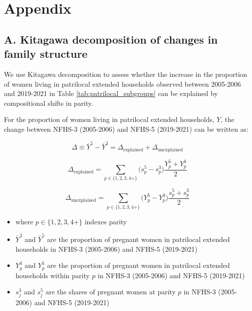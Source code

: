 \documentclass[10pt,twoside,reqno]{article}
\begin{document}
\clearpage
\section*{Appendix}

\setcounter{section}{0}
\renewcommand{\thesection}{A-\arabic{section}}
\setcounter{equation}{0}
\renewcommand{\theequation}{A-\arabic{equation}}
\setcounter{figure}{0}
\renewcommand{\thefigure}{A-\arabic{figure}}
\setcounter{table}{0}
\renewcommand{\thetable}{A-\arabic{table}}




\subsection*{A. Kitagawa decomposition of changes in family structure}

We use Kitagawa decomposition \citep{kitagawa1955components} to assess whether the increase in the proportion of women living in patrilocal extended households observed between 2005-2006 and 2019-2021 in Table \ref{tab:patrilocal_subgroups} can be explained by compositional shifts in parity. 

For the proportion of women living in patrilocal extended households, $Y$, the change between NFHS-3 (2005-2006) and NFHS-5 (2019-2021) can be written as:

\begin{equation}
\Delta \equiv \bar Y^{5} - \bar Y^{3}
= \Delta_{\text{explained}} + \Delta_{\text{unexplained}}
\end{equation}

\begin{equation}
\Delta_{\text{explained}} =
\sum_{p \in \{1,2,3,4+\}} \big(s_p^{5} - s_p^{3}\big)\frac{Y_p^{5} + Y_p^{3}}{2}
\end{equation}

\begin{equation}
\Delta_{\text{unexplained}} =
\sum_{p \in \{1,2,3,4+\}} \big(Y_p^{5} - Y_p^{3}\big)\frac{s_p^{5} + s_p^{3}}{2}
\end{equation}

\begin{itemize}
    \item where $p \in \{1,2,3,4+\}$ indexes parity
    \item $\bar Y^{3}$ and $\bar Y^{5}$ are the proportion of pregnant women in patrilocal extended households in NFHS-3 (2005-2006) and NFHS-5 (2019-2021)
    \item $Y_p^{3}$ and $Y_p^{5}$ are the proportion of pregnant women in patrilocal extended households within parity $p$ in NFHS-3 (2005-2006) and NFHS-5 (2019-2021)
    \item $s_j^{3}$ and $s_j^{5}$ are the shares of pregnant women at parity $p$ in NFHS-3 (2005-2006) and NFHS-5 (2019-2021)
\end{itemize}
\end{document}
